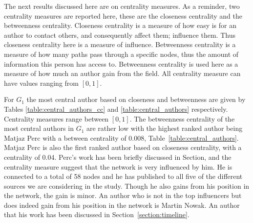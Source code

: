\documentclass{article}
\theoremstyle{definition}
\begin{document}

\newpage

The next results discussed here are on centrality measures. As a reminder,
two centrality measures are reported here, these are the closeness centrality
and the betweenness centrality. Closeness centrality is a measure of how
easy is for an author to contact others, and consequently affect them; influence them.
Thus closeness centrality here is a measure of influence. Betweenness centrality
is a measure of how many paths pass through a specific nodes, thus the amount
of information this person has access to. Betweenness centrality is used here
as a measure of how much an author gain from the field. All centrality measure
can have values ranging from \([0, 1]\).

For \(G_1\)
the most central author based on closeness and betweenness are given by Tables
\ref{table:central_authors_cc} and \ref{table:central_authors} respectively.
Centrality measures range between \([0, 1]\). The betweenness centrality of the
most central authors in \(G_1\) are rather low with the highest ranked author
being Matjaz Perc with a between centrality of 0.008, Table~\ref{table:central_authors}.
Matjaz Perc is also the first ranked author based on closeness centrality, with
a centrality of 0.04. Perc's work has been briefly discussed in Section, and the
centrality measure suggest that the network is very influenced by him. He is
connected to a total of 58 nodes and he has published to all five of the different
sources we are considering in the study. Though he also gains from his position
in the network, the gain is minor. An author who is not in the top influencers but
does indeed gain from his position in the network is Martin Nowak. An author
that his work has been discussed in Section~\ref{section:timeline}.
\end{document}
